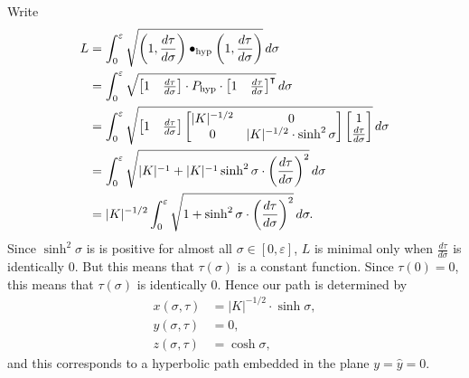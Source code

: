 \documentclass{ximera}
\begin{document}
\begin{problem}
  \begin{freeResponse}
    Write
    \begin{align*}
    L  &=\int_{0}^{\varepsilon} \sqrt{\left(1,\dd[\tau]{\sigma}\right)\bullet_\mathrm{hyp} \left(1,\dd[\tau]{\sigma}\right)}\d\sigma\\
    &= \int_{0}^{\varepsilon} \sqrt{
      \begin{bmatrix} 1 & \dd[\tau]{\sigma}
      \end{bmatrix} \cdot P_\mathrm{hyp}\cdot
      \begin{bmatrix} 1 & \dd[\tau]{\sigma}
      \end{bmatrix}^\transpose}\d\sigma \\
    &= \int_{0}^{\varepsilon} \sqrt{
      \begin{bmatrix} 1 & \dd[\tau]{\sigma}
      \end{bmatrix}
      \begin{bmatrix}
        |K|^{-1/2} & 0 \\
        0 & |K|^{-1/2}\cdot\sinh^2 \sigma
      \end{bmatrix}
      \begin{bmatrix} 1 \\ \dd[\tau]{\sigma}
    \end{bmatrix}}\d\sigma \\
    &= \int_{0}^{\varepsilon} \sqrt{
      |K|^{-1}+|K|^{-1}\sinh^{2}\sigma\cdot \left(\frac{d\tau }{d\sigma}\right)^{2}
    }\d\sigma \\
    &= |K|^{-1/2}\int_{0}^{\varepsilon} \sqrt{
      1+\sinh^{2}\sigma\cdot \left(\frac{d\tau }{d\sigma}\right)^{2}
    }\d\sigma.
    \end{align*}
   Since $\sinh^{2}\sigma$ is is positive for almost all $\sigma\in[
     0,\varepsilon] $, $L$ is minimal only when
   $\frac{d\tau}{d\sigma}$ is identically $0$. But this means that
   $\tau\left( \sigma\right) $ is a constant function. Since
   $\tau\left( 0\right) =0$, this means that $\tau\left( \sigma\right)
   $ is identically $0$. Hence our path is determined by
   \begin{align*}
     x(\sigma,\tau) &=|K|^{-1/2}\cdot \sinh\sigma,\\
     y(\sigma,\tau) &=0,\\
     z(\sigma,\tau) &=\cosh \sigma,
   \end{align*}
   and this corresponds to a hyperbolic path embedded in the plane
   $y=\hat{y}=0$.
  \end{freeResponse}

\end{problem}
\end{document}
